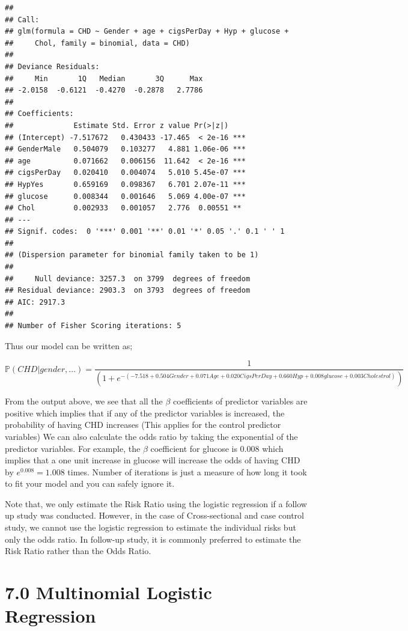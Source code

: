 \documentclass[
]{article}
\begin{document}
\begin{lstlisting}
## 
## Call:
## glm(formula = CHD ~ Gender + age + cigsPerDay + Hyp + glucose + 
##     Chol, family = binomial, data = CHD)
## 
## Deviance Residuals: 
##     Min       1Q   Median       3Q      Max  
## -2.0158  -0.6121  -0.4270  -0.2878   2.7786  
## 
## Coefficients:
##              Estimate Std. Error z value Pr(>|z|)    
## (Intercept) -7.517672   0.430433 -17.465  < 2e-16 ***
## GenderMale   0.504079   0.103277   4.881 1.06e-06 ***
## age          0.071662   0.006156  11.642  < 2e-16 ***
## cigsPerDay   0.020410   0.004074   5.010 5.45e-07 ***
## HypYes       0.659169   0.098367   6.701 2.07e-11 ***
## glucose      0.008344   0.001646   5.069 4.00e-07 ***
## Chol         0.002933   0.001057   2.776  0.00551 ** 
## ---
## Signif. codes:  0 '***' 0.001 '**' 0.01 '*' 0.05 '.' 0.1 ' ' 1
## 
## (Dispersion parameter for binomial family taken to be 1)
## 
##     Null deviance: 3257.3  on 3799  degrees of freedom
## Residual deviance: 2903.3  on 3793  degrees of freedom
## AIC: 2917.3
## 
## Number of Fisher Scoring iterations: 5
\end{lstlisting}

Thus our model can be written as;

\[\mathbb{P}(CHD|gender,\dots)=\frac{1}{(1+e^{-(-7.518+0.504Gender+0.071Age+0.020CigsPerDay+0.660Hyp+0.008glucose+0.003Cholestrol)})}\]

From the output above, we see that all the \(\beta\) coefficients of
predictor variables are positive which implies that if any of the
predictor variables is increased, the probability of having CHD
increases (This applies for the control predictor variables) We can also
calculate the odds ratio by taking the exponential of the predictor
variables. For example, the \(\beta\) coefficient for glucose is
\(0.008\) which implies that a one unit increase in glucose will
increase the odds of having CHD by \(e^{0.008}=1.008\) times. Number of
iterations is just a measure of how long it took to fit your model and
you can safely ignore it.

Note that, we only estimate the Risk Ratio using the logistic regression
if a follow up study was conducted. However, in the case of
Cross-sectional and case control study, we cannot use the logistic
regression to estimate the individual risks but only the odds ratio. In
follow-up study, it is commonly preferred to estimate the Risk Ratio
rather than the Odds Ratio.

\newpage

\hypertarget{multinomial-logistic-regression}{%
\section{7.0 Multinomial Logistic
Regression}\label{multinomial-logistic-regression}}
\end{document}
